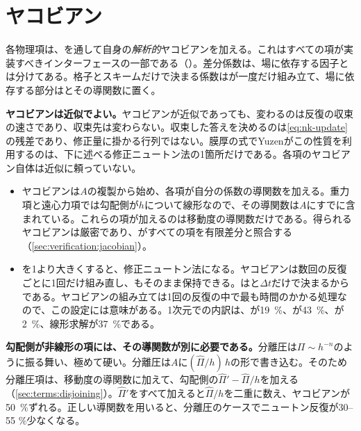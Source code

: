 \section{ヤコビアン}
\label{sec:time:jacobian}

各物理項は、を通して自身の\emph{解析的}ヤコビアンを加える。これはすべての項が実装すべきインターフェースの一部である（）。差分係数は、場に依存する因子とは分けてある。格子とスキームだけで決まる係数はが一度だけ組み立て、場に依存する部分はとその導関数に置く。

\textbf{ヤコビアンは近似でよい。}ヤコビアンが近似であっても、変わるのは反復の収束の速さであり、収束先は変わらない。収束した答えを決めるのは\cref{eq:nk-update}の残差であり、修正量に掛かる行列ではない。膜厚の式でYuzenがこの性質を利用するのは、下に述べる修正ニュートン法の1箇所だけである。各項のヤコビアン自体は近似に頼っていない。

\begin{itemize}
  \item ヤコビアンは$A$の複製から始め、各項が自分の係数の導関数を加える。重力項と遠心力項では勾配側が$h$について線形なので、その導関数は$A$にすでに含まれている。これらの項が加えるのは移動度の導関数だけである。得られるヤコビアンは厳密であり、がすべての項を有限差分と照合する（\cref{sec:verification:jacobian}）。
  \item {}を1より大きくすると、修正ニュートン法になる。ヤコビアンは数回の反復ごとに1回だけ組み直し、もそのまま保持できる。はと$\Delta t$だけで決まるからである。ヤコビアンの組み立ては1回の反復の中で最も時間のかかる処理なので、この設定には意味がある。1次元での内訳は、が\SI{19}{\percent}、が\SI{43}{\percent}、が\SI{2}{\percent}、線形求解が\SI{37}{\percent}である。
\end{itemize}

\textbf{勾配側が非線形の項には、その導関数が別に必要である。}分離圧は$\Pi \sim h^{-n}$のように振る舞い、極めて硬い。分離圧は$A$に$(\hat\Pi/h)\,h$の形で書き込む。そのため分離圧項は、移動度の導関数に加えて、勾配側の$\hat\Pi' - \hat\Pi/h$を加える（\cref{sec:terms:disjoining}）。$\hat\Pi'$をすべて加えると$\hat\Pi/h$を二重に数え、ヤコビアンが\SI{50}{\percent}ずれる。正しい導関数を用いると、分離圧のケースでニュートン反復が30--55 \%少なくなる。

